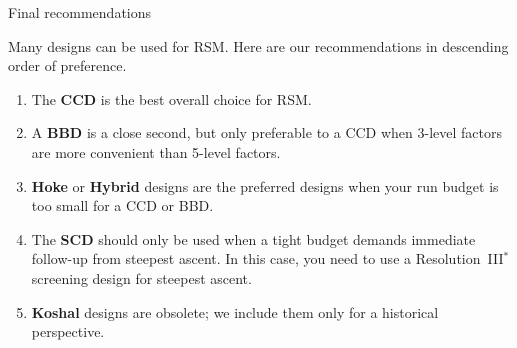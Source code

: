 \documentclass[9pt]{beamer}
\begin{document}
\begin{frame}{Final recommendations}

Many designs can be used for RSM. Here are our recommendations in descending order of preference.

\begin{enumerate}
	\item The \textbf{CCD} is the best overall choice for RSM.
	\item A \textbf{BBD} is a close second, but only preferable to a CCD when 3-level factors are more convenient than 5-level factors.
	\item \textbf{Hoke} or \textbf{Hybrid} designs are the preferred designs when your run budget is too small for a CCD or BBD.
	\item The \textbf{SCD} should only be used when a tight budget demands immediate follow-up from steepest ascent. In this case, you need to use a Resolution~III$^*$ screening design for steepest ascent.
	\item \textbf{Koshal} designs are obsolete; we include them only for a historical perspective.
\end{enumerate}

\end{frame}
\end{document}
